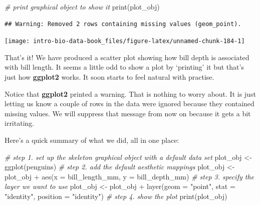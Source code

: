 \documentclass[
]{book}
\newenvironment{Shaded}{\begin{snugshade}}{\end{snugshade}}
\newcommand{\AttributeTok}[1]{\textcolor[rgb]{0.77,0.63,0.00}{#1}}
\newcommand{\CommentTok}[1]{\textcolor[rgb]{0.56,0.35,0.01}{\textit{#1}}}
\newcommand{\FunctionTok}[1]{\textcolor[rgb]{0.00,0.00,0.00}{#1}}
\newcommand{\NormalTok}[1]{#1}
\newcommand{\OtherTok}[1]{\textcolor[rgb]{0.56,0.35,0.01}{#1}}
\newcommand{\SpecialCharTok}[1]{\textcolor[rgb]{0.00,0.00,0.00}{#1}}
\newcommand{\StringTok}[1]{\textcolor[rgb]{0.31,0.60,0.02}{#1}}
\begin{document}
\begin{Shaded}
\begin{Highlighting}[]
\CommentTok{\# \textquotesingle{}print\textquotesingle{} graphical object to show it}
\FunctionTok{print}\NormalTok{(plot\_obj)}
\end{Highlighting}
\end{Shaded}

\begin{verbatim}
## Warning: Removed 2 rows containing missing values (geom_point).
\end{verbatim}

\begin{center}\texttt{[image: intro-bio-data-book\_files/figure-latex/unnamed-chunk-184-1]} \end{center}

That's it! We have produced a scatter plot showing how bill depth is associated with bill length. It seems a little odd to show a plot by `printing' it but that's just how \textbf{ggplot2} works. It soon starts to feel natural with practise.

Notice that \textbf{ggplot2} printed a warning. That is nothing to worry about. It is just letting us know a couple of rows in the data were ignored because they contained missing values. We will suppress that message from now on because it gets a bit irritating.

Here's a quick summary of what we did, all in one place:

\begin{Shaded}
\begin{Highlighting}[]
\CommentTok{\# step 1. set up the skeleton graphical object with a default data set}
\NormalTok{plot\_obj }\OtherTok{\textless{}{-}} \FunctionTok{ggplot}\NormalTok{(penguins)}
\CommentTok{\# step 2. add the default aesthetic mappings}
\NormalTok{plot\_obj }\OtherTok{\textless{}{-}}\NormalTok{ plot\_obj }\SpecialCharTok{+} \FunctionTok{aes}\NormalTok{(}\AttributeTok{x =}\NormalTok{ bill\_length\_mm, }\AttributeTok{y =}\NormalTok{ bill\_depth\_mm)}
\CommentTok{\# step 3. specify the layer we want to use}
\NormalTok{plot\_obj }\OtherTok{\textless{}{-}}\NormalTok{ plot\_obj }\SpecialCharTok{+} \FunctionTok{layer}\NormalTok{(}\AttributeTok{geom =} \StringTok{"point"}\NormalTok{, }\AttributeTok{stat =} \StringTok{"identity"}\NormalTok{, }\AttributeTok{position =} \StringTok{"identity"}\NormalTok{)}
\CommentTok{\# step 4. show the plot}
\FunctionTok{print}\NormalTok{(plot\_obj)}
\end{Highlighting}
\end{Shaded}
\end{document}
